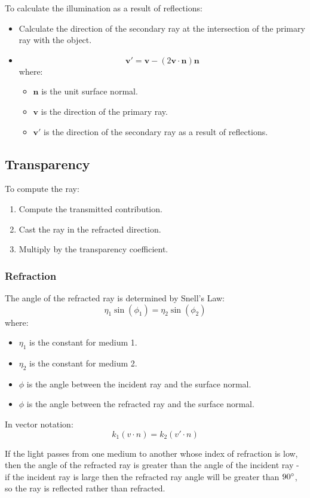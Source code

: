 \documentclass[11pt]{article}
\begin{document}
To calculate the illumination as a result of reflections:
\begin{itemize}
  \item Calculate the direction of the secondary ray at the intersection of the primary ray with the object.
  \item 
    \[
      \bm{v}' = \bm{v} - (2 \bm{v} \cdot \bm{n}) \bm{n} 
    \]
    where:
    \begin{itemize}
      \item $\bm{n}$ is the unit surface normal.
      \item $\bm{v}$ is the direction of the primary ray.
      \item $\bm{v}'$ is the direction of the secondary ray as a result of reflections.
    \end{itemize}
\end{itemize}

\subsection{Transparency}
To compute the ray:
\begin{enumerate}
  \item Compute the transmitted contribution.
  \item Cast the ray in the refracted direction.
  \item Multiply by the transparency coefficient.
\end{enumerate}

\subsubsection{Refraction}
The angle of the refracted ray is determined by Snell's Law:
\[
  \eta_1 \sin(\phi_1) = \eta_2 \sin(\phi_2)
\]
where:
\begin{itemize}
  \item $\eta_1$ is the constant for medium 1.
  \item $\eta_2$ is the constant for medium 2.
  \item $\phi$ is the angle between the incident ray and the surface normal.
  \item $\phi$ is the angle between the refracted ray and the surface normal.
\end{itemize}

In vector notation:
\[
  k_1 (v \cdot n) = k_2 (v' \cdot n) 
\]

If the light passes from one medium to another whose index of refraction is low, then the angle of the refracted ray is greater than the angle of the incident ray - if the incident ray is large then the refracted ray angle will be greater than $90\degree$, so the ray is reflected rather than refracted.
\end{document}
